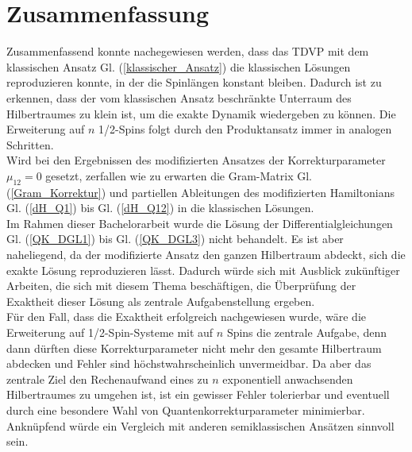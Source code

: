 \chapter{Zusammenfassung}
Zusammenfassend konnte nachegewiesen werden, dass das TDVP mit dem klassischen Ansatz Gl. (\ref{klassischer_Ansatz}) die klassischen Lösungen reproduzieren 
konnte, in der die Spinlängen konstant bleiben. Dadurch ist zu erkennen, dass der vom klassischen Ansatz beschränkte Unterraum des Hilbertraumes zu klein
ist, um die exakte Dynamik wiedergeben zu können. Die Erweiterung auf $n$ 1/2-Spins folgt durch den Produktansatz immer in analogen Schritten.\\
Wird bei den Ergebnissen des modifizierten Ansatzes der Korrekturparameter $\mu_{12}=0$ gesetzt, zerfallen wie zu erwarten
die Gram-Matrix Gl. (\ref{Gram_Korrektur}) und partiellen Ableitungen des modifizierten Hamiltonians Gl. (\ref{dH_Q1}) bis Gl. (\ref{dH_Q12})
in die klassischen Lösungen.\\

Im Rahmen dieser Bachelorarbeit wurde die Lösung der Differentialgleichungen Gl. (\ref{QK_DGL1}) bis Gl. (\ref{QK_DGL3}) nicht behandelt. Es ist 
aber naheliegend, da der modifizierte Ansatz den ganzen Hilbertraum abdeckt, sich die exakte Lösung reproduzieren lässt. Dadurch würde sich 
mit Ausblick zukünftiger Arbeiten, die sich mit diesem Thema beschäftigen, die Überprüfung der Exaktheit dieser Lösung als zentrale Aufgabenstellung ergeben. \\
Für den Fall, dass die Exaktheit erfolgreich nachgewiesen wurde, wäre die Erweiterung auf 1/2-Spin-Systeme mit auf $n$ Spins die zentrale Aufgabe, 
denn dann dürften diese Korrekturparameter nicht mehr den gesamte Hilbertraum abdecken und Fehler sind höchstwahrscheinlich unvermeidbar. 
Da aber das zentrale Ziel den Rechenaufwand eines zu $n$ exponentiell anwachsenden Hilbertraumes zu umgehen ist, ist 
ein gewisser Fehler tolerierbar und eventuell durch eine besondere Wahl von Quantenkorrekturparameter minimierbar. Anknüpfend würde ein Vergleich mit 
anderen semiklassischen Ansätzen sinnvoll sein.
